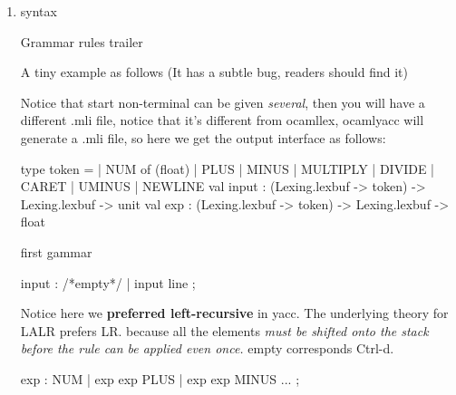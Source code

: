 


\begin{enumerate}
\item syntax \\

  \begin{bluetext}
    Grammar rules 
    trailer 
  \end{bluetext}

A tiny example as follows (It has a subtle bug, readers should find it)  

Notice that start non-terminal can be given \textit{several}, then you will
have a different .mli file, notice that it's different from ocamllex,
ocamlyacc will generate a .mli file, so here we get the output
interface as follows:

\begin{bluetext}
\end{bluetext}

\begin{bluecode}
type token =
  | NUM of (float)
  | PLUS
  | MINUS
  | MULTIPLY
  | DIVIDE
  | CARET
  | UMINUS
  | NEWLINE
val input :
  (Lexing.lexbuf  -> token) -> Lexing.lexbuf -> unit
val exp :
  (Lexing.lexbuf  -> token) -> Lexing.lexbuf -> float
\end{bluecode}


first gammar
\begin{bluetext}
  input : /*empty*/ {} | input line {}; 
\end{bluetext}
Notice here we \textbf{preferred left-recursive} in yacc.
The underlying theory for LALR prefers LR. because all the elements
\textit{must be shifted onto the stack before the rule can be applied even once.}
empty corresponds Ctrl-d.
\begin{bluetext}
  exp : NUM | exp exp PLUS | exp exp MINUS  ... ; 
\end{bluetext}


\end{enumerate}
